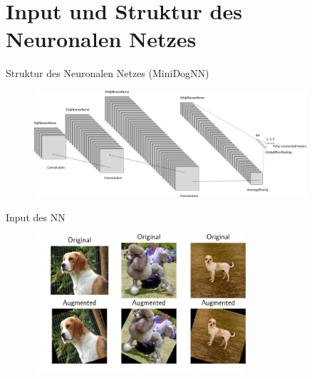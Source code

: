 


\maketitle
  \section{Input und Struktur des Neuronalen Netzes}

  \begin{frame}[noframenumbering]
    \tableofcontents[currentsection]
  \end{frame}

  \begin{frame}{Struktur des Neuronalen Netzes (MiniDogNN)}
    \begin{figure}
      \centering
      \includegraphics[width=0.9\textwidth]{logos/nn.pdf}
      \label{fig:1}
    \end{figure}
  \end{frame}
  \begin{frame}{Input des NN}
    \begin{figure}
      \centering
      \includegraphics[width=0.7\textwidth]{logos/subplot.pdf}
      \label{fig:input}
    \end{figure}
  \end{frame}

